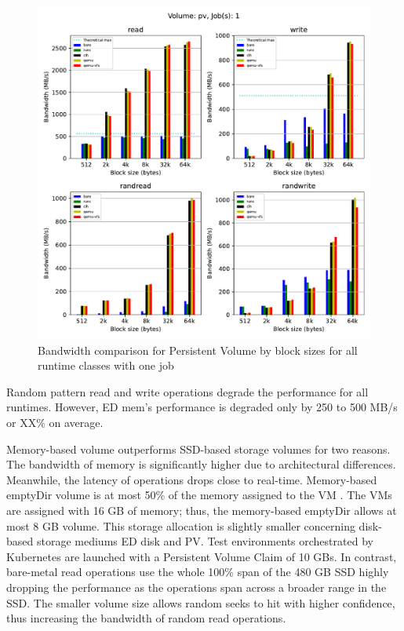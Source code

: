 \begin{figure}[ht]
  \begin{center}
    \includegraphics[width=12cm]{results/subplot_bw_by_bs_with_bare(pv,1).pdf}
    \caption{Bandwidth comparison for Persistent Volume by block sizes for all runtime classes with one job}
    \label{fig:ResultsPVByBS-1}
  \end{center}
\end{figure}
 

Random pattern read and write operations degrade the performance for all runtimes. However, ED mem's performance is degraded only by 250 to 500 MB/s or XX\% on average. 

Memory-based volume outperforms SSD-based storage volumes for two reasons. The bandwidth of memory is significantly higher due to architectural differences. Meanwhile, the latency of operations drops close to real-time. Memory-based emptyDir volume is at most 50\% of the memory assigned to the VM \cite{VolumesKubernetes}. The VMs are assigned with 16 GB of memory; thus, the memory-based emptyDir allows at most 8 GB volume. This storage allocation is slightly smaller concerning disk-based storage mediums ED disk and PV. Test environments orchestrated by Kubernetes are launched with a Persistent Volume Claim of 10 GBs. In contrast, bare-metal read operations use the whole 100\% span of the 480 GB SSD \cite{IntelSSD} highly dropping the performance as the operations span across a broader range in the SSD. The smaller volume size allows random seeks to hit with higher confidence, thus increasing the bandwidth of random read operations.

